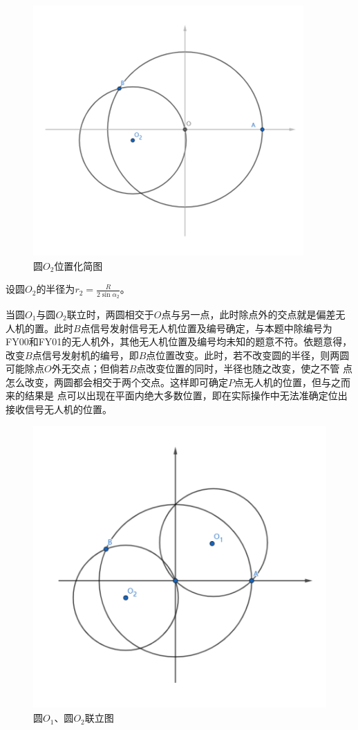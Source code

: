 \begin{figure}[h]
    \centering
    \includegraphics{res/figure04111100.png}
    \caption{圆$O_2$位置化简图}
\end{figure}

设圆$O_2$的半径为$r_2=\frac{R}{2\sin\alpha_2}$。

当圆$O_1$与圆$O_2$联立时，两圆相交于$O$点与另一点，此时除点外的交点就是偏差无人机的置。此时$B$点信号发射信号无人机位置及编号确定，与本题中除编号为FY00和FY01的无人机外，其他无人机位置及编号均未知的题意不符。依题意得，改变$B$点信号发射机的编号，即$B$点位置改变。此时，若不改变圆的半径，则两圆可能除点$O$外无交点；但倘若$B$点改变位置的同时，半径也随之改变，使之不管 点怎么改变，两圆都会相交于两个交点。这样即可确定$P$点无人机的位置，但与之而来的结果是 点可以出现在平面内绝大多数位置，即在实际操作中无法准确定位出接收信号无人机的位置。

\begin{figure}[h]
    \centering
    \includegraphics{res/figure111106.png}
    \caption{圆$O_1$、圆$O_2$联立图}
\end{figure}

